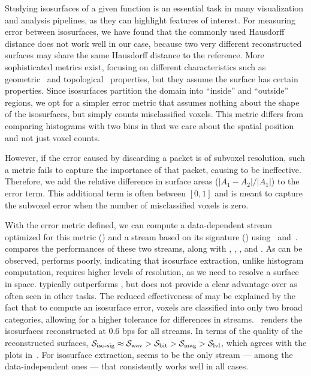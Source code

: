 Studying isosurfaces of a given function is an essential task in many visualization and analysis
pipelines, as they can highlight features of interest. For measuring error between isosurfaces, we
have found that the commonly used Hausdorff distance does not work well in our case, because two
very different reconstructed surfaces may share the same Hausdorff distance to the reference. More
sophisticated metrics exist, focusing on different characteristics such as
geometric~\cite{verifiable-isosurface} and topological~\cite{topology-verification-isosurface}
properties, but they assume the surface has certain properties. Since isosurfaces partition the
domain into ``inside'' and ``outside'' regions, we opt for a simpler error metric that assumes
nothing about the shape of the isosurfaces, but simply counts misclassified voxels. This metric
differs from comparing histograms with two bins in that we care about the spatial position and not
just voxel counts.

However, if the error caused by discarding a packet is of subvoxel resolution, such a metric fails
to capture the importance of that packet, causing \siop to be ineffective. Therefore, we add the
relative difference in surface areas ($|A_1-A_2|/|A_1|$) to the error term. This additional term is
often between $[0, 1]$ and is meant to capture the subvoxel error when the number of misclassified
voxels is zero.

With the error metric defined, we can compute a data-dependent stream optimized for this metric
(\siop) and a stream based on its signature (\sisg) using~
and~.  compares the performances of these two
streams, along with \sbit, \slvl, \swav, and \smag. As can be observed, \slvl performs poorly,
indicating that isosurface extraction, unlike histogram computation, requires higher levels of
resolution, as we need to resolve a surface in space. \swav typically outperforms \sbit, but \sisg
does not provide a clear advantage over \swav as often seen in other tasks. The reduced
effectiveness of \sisg may be explained by the fact that to compute an isosurface error, voxels are
classified into only two broad categories, allowing for a higher tolerance for differences in
streams.~ renders the isosurfaces reconstructed at 0.6 bps
for all streams. In terms of the quality of the reconstructed surfaces, $\sisg \approx \swav > \sbit
> \smag > \slvl$, which agrees with the plots in~. For isosurface
extraction, \swav seems to be the only stream --- among the data-independent ones --- that
consistently works well in all cases.
